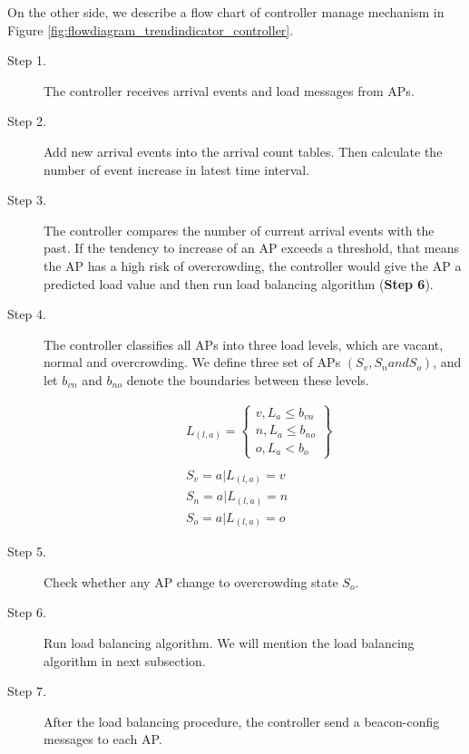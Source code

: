 
On the other side, we describe a flow chart of controller manage mechanism in Figure \ref{fig:flowdiagram_trendindicator_controller}.

\begin{description}
  \item [Step 1.] The controller receives arrival events and load messages from APs.
  \item [Step 2.] Add new arrival events into the arrival count tables. Then calculate the number of event increase in latest time interval.
  \item [Step 3.] The controller compares the number of current arrival events with the past. If the tendency to increase of an AP exceeds a threshold, that means the AP has a high risk of overcrowding, the controller would give the AP a predicted load value and then run load balancing algorithm (\textbf{Step 6}).
  \item [Step 4.] The controller classifies all APs into three load levels, which are vacant, normal and overcrowding. We define three set of APs $({S_v}, {S_n} and {S_o})$, and let $b_{vn}$  and $b_{no}$ denote the boundaries between these levels.

      \begin{align}
        &L_(l,a)=\left\{\begin{array}{rcl}
            v, L_a≤b_{vn} \\ n, L_a≤b_{no} \\ o, L_a<b_o
            \end{array} \right\} \\
            \nonumber\\
        &S_v={a|L_(l,a)=v}\\
        &S_n={a|L_(l,a)=n}\\
        &S_o={a|L_(l,a)=o}
      \end{align}
  \item [Step 5.] Check whether any AP change to overcrowding state $S_o$.
  \item [Step 6.] Run load balancing algorithm. We will mention the load balancing algorithm in next subsection.
  \item [Step 7.] After the load balancing procedure, the controller send a beacon-config messages to each AP.
\end{description}


